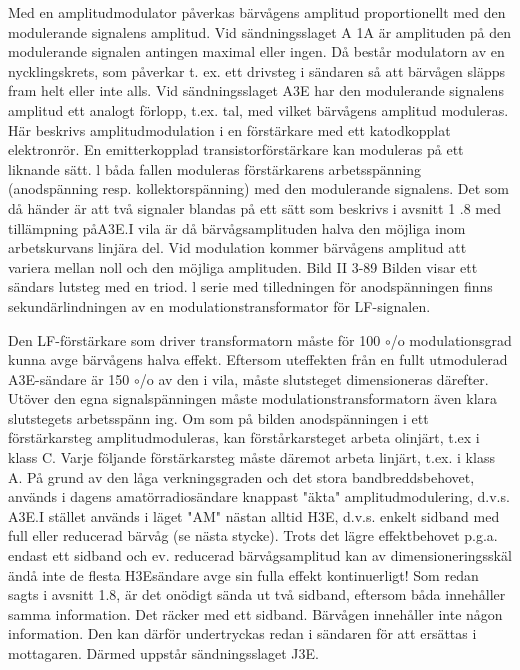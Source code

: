 \documentclass[a4paper,twoside,twocolumn,openright]{book}
\begin{document}
{{{Med en amplitudmodulator påverkas bärvågens amplitud proportionellt med den modulerande signalens amplitud.
Vid sändningsslaget A 1A är amplituden
på den modulerande signalen antingen maximal eller ingen. Då består modulatorn av en
nycklingskrets, som påverkar t. ex. ett drivsteg i sändaren så att bärvågen släpps fram
helt eller inte alls.
Vid sändningsslaget A3E har den modulerande signalens amplitud ett analogt förlopp, t.ex. tal, med vilket bärvågens amplitud moduleras. Här beskrivs amplitudmodulation i en förstärkare med ett katodkopplat
elektronrör. En emitterkopplad transistorförstärkare kan moduleras på ett liknande
sätt. l båda fallen moduleras förstärkarens
arbetsspänning (anodspänning resp. kollektorspänning) med den modulerande signalens. Det som då händer är att två signaler
blandas på ett sätt som beskrivs i avsnitt 1 .8
med tillämpning påA3E.I vila är då bärvågsamplituden halva den möjliga inom arbetskurvans linjära del. Vid modulation kommer
bärvågens amplitud att variera mellan noll
och den möjliga amplituden.
Bild II 3-89
Bilden visar ett sändars lutsteg med en triod.
l serie med tilledningen för anodspänningen
finns sekundärlindningen av en modulationstransformator för LF-signalen.

Den LF-förstärkare som driver transformatorn måste för 100 $\circ$/o modulationsgrad
kunna avge bärvågens halva effekt. Eftersom uteffekten från en fullt utmodulerad
A3E-sändare är 150 $\circ$/o av den i vila, måste
slutsteget dimensioneras därefter. Utöver
den egna signalspänningen måste modulationstransformatorn även klara slutstegets
arbetsspänn ing.
Om som på bilden anodspänningen i ett
förstärkarsteg amplitudmoduleras, kan förstårkarsteget arbeta olinjärt, t.ex i klass C.
Varje följande förstärkarsteg måste däremot
arbeta linjärt, t.ex. i klass A.
På grund av den låga verkningsgraden
och det stora bandbreddsbehovet, används
i dagens amatörradiosändare knappast
"äkta" amplitudmodulering, d.v.s. A3E.I stället används i läget "AM" nästan alltid H3E,
d.v.s. enkelt sidband med full eller reducerad bärvåg (se nästa stycke). Trots det lägre
effektbehovet p.g.a. endast ett sidband och
ev. reducerad bärvågsamplitud kan av dimensioneringsskäl ändå inte de flesta H3Esändare avge sin fulla effekt kontinuerligt!
Som redan sagts i avsnitt 1.8, är det onödigt
sända ut två sidband, eftersom båda innehåller samma information. Det räcker med
ett sidband. Bärvågen innehåller inte någon
information. Den kan därför undertryckas
redan i sändaren för att ersättas i mottagaren. Därmed uppstår sändningsslaget J3E.

}}}
\end{document}
